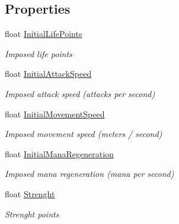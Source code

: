 \subsection*{Properties}
\begin{DoxyCompactItemize}
\item 
float \hyperlink{class_hel_project_1_1_features_1_1_feature_collection_a4c9536777b3c49fe8804f04af8d334fd}{Initial\+Life\+Points}
\begin{DoxyCompactList}\small\item\em Imposed life points \end{DoxyCompactList}\item 
float \hyperlink{class_hel_project_1_1_features_1_1_feature_collection_aaec4f751de75d95d240fa22e8826dde7}{Initial\+Attack\+Speed}
\begin{DoxyCompactList}\small\item\em Imposed attack speed (attacks per second) \end{DoxyCompactList}\item 
float \hyperlink{class_hel_project_1_1_features_1_1_feature_collection_a9895c940500d9d028278ea3c175fd916}{Initial\+Movement\+Speed}
\begin{DoxyCompactList}\small\item\em Imposed movement speed (meters / second) \end{DoxyCompactList}\item 
float \hyperlink{class_hel_project_1_1_features_1_1_feature_collection_a83624876566cbf6cf24e9f566bbd701e}{Initial\+Mana\+Regeneration}
\begin{DoxyCompactList}\small\item\em Imposed mana regeneration (mana per second) \end{DoxyCompactList}\item 
float \hyperlink{class_hel_project_1_1_features_1_1_feature_collection_a69632e8a405d871ac827107ddb4b24f3}{Strenght}
\begin{DoxyCompactList}\small\item\em Strenght points \end{DoxyCompactList}\item 

\end{DoxyCompactItemize}
